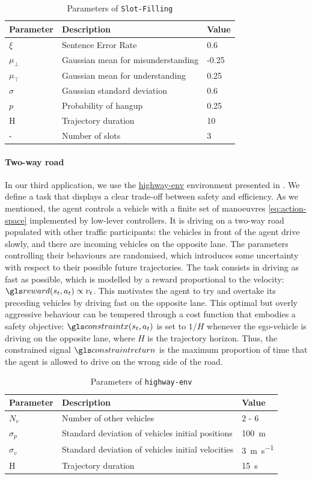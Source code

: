 \begin{table}[ht!]
    \centering
    \begin{tabular}{lll}
        \toprule
        Parameter & Description & Value\tabularnewline
        \midrule
        $\xi$ & Sentence Error Rate & 0.6\tabularnewline
        $\mu_{\bot}$& Gaussian mean for misunderstanding & -0.25\tabularnewline
        $\mu_{\top}$& Gaussian mean for understanding & 0.25\tabularnewline
        $\sigma$& Gaussian standard deviation & 0.6\tabularnewline
        $p$& Probability of hangup & 0.25\tabularnewline
        H & Trajectory duration & 10\tabularnewline
        - & Number of slots & 3\tabularnewline
        \bottomrule
    \end{tabular}
    \caption{Parameters of \texttt{Slot-Filling}}
    \label{tab:param-slot-filling}
\end{table}

\paragraph{Two-way road}
In our third application, we use the \href{https://github.com/eleurent/highway-env}{highway-env} environment presented in .
We define a task that displays a clear trade-off between safety and efficiency. As we mentioned, the agent controls a vehicle with a finite set \cA of manoeuvres \eqref{eq:action-space} implemented by low-lever controllers. It is driving on a two-way road populated with other traffic participants: the vehicles in front of the agent drive slowly, and there are incoming vehicles on the opposite lane. The parameters controlling their behaviours are randomised, which introduces some uncertainty with respect to their possible future trajectories.
The task consists in driving as fast as possible, which is modelled by a reward proportional to the velocity: $\R(s_t, a_t) \propto v_t$. This motivates the agent to try and overtake its preceding vehicles by driving fast on the opposite lane. This optimal but overly aggressive behaviour can be tempered through a cost function that embodies a safety objective: $\constraint(s_t, a_t)$ is set to $1/H$ whenever the ego-vehicle is driving on the opposite lane, where $H$ is the trajectory horizon. Thus, the constrained signal $\constraintreturn$ is the maximum proportion of time that the agent is allowed to drive on the wrong side of the road.

\begin{table}[ht!]
    \centering
    \begin{tabular}{lll}
        \toprule
        Parameter & Description & Value\tabularnewline
        \midrule
        $N_v$& Number of other vehicles & 2 - 6\tabularnewline
        $\sigma_p$& Standard deviation of vehicles initial positions & \SI{100}{\meter}\tabularnewline
        $\sigma_v$& Standard deviation of vehicles initial velocities & \SI{3}{\meter\per\second}\tabularnewline
        H & Trajectory duration & \SI{15}{\second}\tabularnewline
        \bottomrule
    \end{tabular}

    \caption{Parameters of \texttt{highway-env}}
    \label{tab:param-highway-env}
\end{table}


